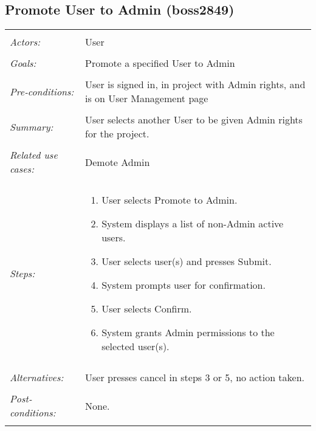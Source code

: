 \documentclass[11pt]{report}
\begin{document}
\subsection{Promote User to Admin  (boss2849)}
\begin{tabular}{ p{2cm} p{12cm} }
 \hline
 \\
 \textit{Actors:} & User \\ 
 \\
 \textit{Goals:} & Promote a specified User to Admin \\
 \\
 \textit{Pre-conditions:} & User is signed in, in project with Admin rights, and is on User Management page \\
 \\
 \textit{Summary:} & User selects another User to be given Admin rights for the project. \\ 
 \\
 \textit{Related use cases:} & Demote Admin \\ 
 \\
 \textit{Steps:} & \begin{enumerate}
  \item User selects Promote to Admin.
  \item System displays a list of non-Admin active users.
  \item User selects user(s) and presses Submit.
  \item System prompts user for confirmation.
  \item User selects Confirm.
  \item System grants Admin permissions to the selected user(s).
 \end{enumerate} \\
 \\
 \textit{Alternatives:} & User presses cancel in steps 3 or 5, no action taken. \\
 \\
 \textit{Post-conditions:} & None. \\
 \\
\hline
\end{tabular}
\end{document}
